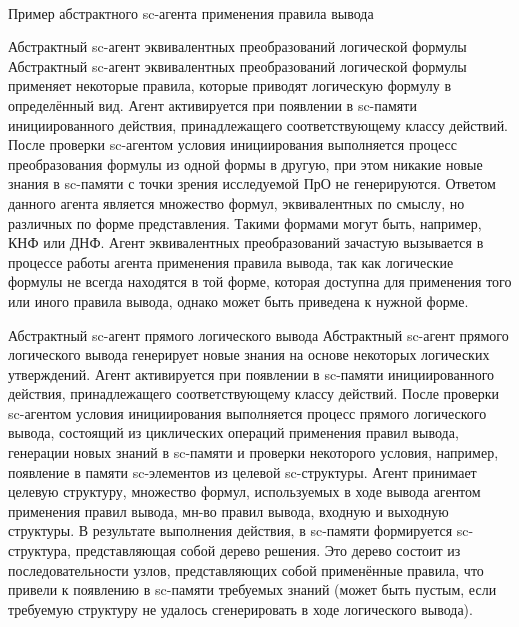 \begin{frame}{\\Пример абстрактного sc-агента применения правила вывода}
\end{frame}

\begin{frame}{\Large Абстрактный sc-агент эквивалентных преобразований логической формулы}
\vspace{10mm}
  Абстрактный sc-агент эквивалентных преобразований логической формулы применяет некоторые правила, которые приводят логическую формулу в определённый вид. Агент активируется при появлении в sc-памяти инициированного действия, принадлежащего соответствующему классу действий. После проверки sc-агентом условия инициирования выполняется процесс преобразования формулы из одной формы в другую, при этом никакие новые знания в sc-памяти с точки зрения исследуемой ПрО не генерируются. Ответом данного агента является множество формул, эквивалентных по смыслу, но различных по форме представления. Такими формами могут быть, например, КНФ или ДНФ. Агент эквивалентных преобразований зачастую вызывается в процессе работы агента применения правила вывода, так как логические формулы не всегда находятся в той форме, которая доступна для применения того или иного правила вывода, однако может быть приведена к нужной форме.  
\end{frame}

\begin{frame}{\Large Абстрактный sc-агент прямого логического вывода}
\vspace{10mm}
  Абстрактный sc-агент прямого логического вывода генерирует новые знания на основе некоторых логических утверждений. Агент активируется при появлении в sc-памяти инициированного действия, принадлежащего соответствующему классу действий. После проверки sc-агентом условия инициирования выполняется процесс прямого логического вывода, состоящий из циклических операций применения правил вывода, генерации новых знаний в sc-памяти и проверки некоторого условия, например, появление в памяти sc-элементов из целевой sc-структуры. Агент принимает целевую структуру, множество формул, используемых в ходе вывода агентом применения правил вывода, мн-во правил вывода, входную и выходную структуры. В результате выполнения действия, в sc-памяти формируется sc-структура, представляющая собой дерево решения. Это дерево состоит из последовательности узлов, представляющих собой применённые правила, что привели к появлению в sc-памяти требуемых знаний (может быть пустым, если требуемую структуру не удалось сгенерировать в ходе логического вывода).  
\end{frame}

